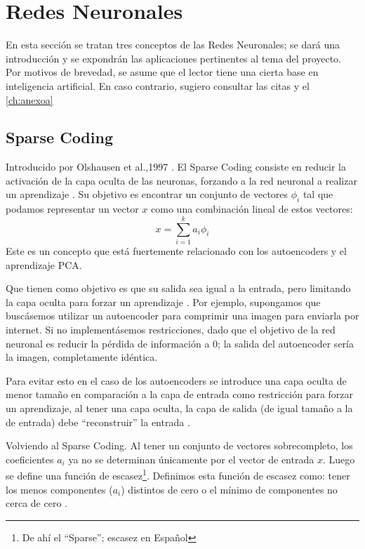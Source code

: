 \section{Redes Neuronales}

En esta sección se tratan tres conceptos de las Redes Neuronales; se dará una introducción y se expondrán las aplicaciones pertinentes al tema del proyecto.
Por motivos de brevedad, se asume que el lector tiene una cierta base en inteligencia artificial. En caso contrario, sugiero consultar las citas y el \autoref{ch:anexoa}
\subsection{Sparse Coding}
Introducido por Olshausen et al.,1997 \autocite{OLSHAUSEN}. El Sparse Coding consiste en reducir la activación de la capa oculta de las neuronas, forzando a la red neuronal a realizar un aprendizaje \autocite{stanfordSparse}.
Su objetivo es encontrar un conjunto de vectores $\phi_i$ tal que podamos representar un vector $x$ como una combinación lineal de estos vectores: 
$$
x = \sum_{i=1}^{k}a_i\phi_i
$$
Este es un concepto que está fuertemente relacionado con los autoencoders y el aprendizaje PCA. 

Que tienen como objetivo es que su salida sea igual a la entrada, pero limitando la capa oculta para forzar un aprendizaje \autocite{stanfordAutoEncoding}.
Por ejemplo, supongamos que buscásemos utilizar un autoencoder para comprimir una imagen para enviarla por internet. Si no implementásemos restricciones, dado que el objetivo de la red neuronal es reducir la pérdida de información a 0; la salida del autoencoder sería la imagen, completamente idéntica.

Para evitar esto en el caso de los autoencoders se introduce una capa oculta de menor tamaño en comparación a la capa de entrada como restricción para forzar un aprendizaje, al tener una capa oculta, la capa de salida (de igual tamaño a la de entrada) debe \enquote{reconstruir} la entrada \autocite{stanfordAutoEncoding} .

Volviendo al Sparse Coding. Al tener un conjunto de vectores sobrecompleto, los coeficientes $a_i$ ya no se determinan únicamente por el vector de entrada $x$. Luego se define una función de escasez\footnote{De ahí el \enquote{Sparse}; escasez en Español}. Definimos esta función de escasez como: tener los menos componentes ($a_i$) distintos de cero o el mínimo de componentes no cerca de cero \autocite{stanfordSparse}.


